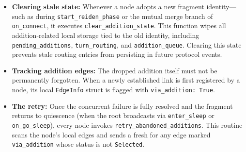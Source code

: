\begin{itemize}
  \item \textbf{Clearing stale state:} Whenever a node adopts a new fragment identity—such as during \texttt{start\_reiden\_phase} or the mutual merge branch of \texttt{on\_connect}, it executes \texttt{clear\_addition\_state}. This function wipes all addition-related local storage tied to the old identity, including \texttt{pending\_additions}, \texttt{turn\_routing}, and \texttt{addition\_queue}. Clearing this state prevents stale routing entries from persisting in future protocol events.
  
  \item \textbf{Tracking addition edges:} The dropped addition itself must not be permanently forgotten. When a newly established link is first registered by a node, its local \texttt{EdgeInfo} struct is flagged with \texttt{via\_addition: True}.
  
  \item \textbf{The retry:} Once the concurrent failure is fully resolved and the fragment returns to quiescence (when the root broadcasts  via \texttt{enter\_sleep} or \texttt{on\_go\_sleep}), every node invokes \texttt{retry\_abandoned\_additions}. This routine scans the node's local edges and sends a fresh  for any edge marked \texttt{via\_addition} whose status is not \texttt{Selected}.
\end{itemize}